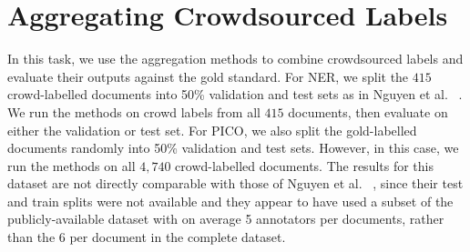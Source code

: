 \section{Aggregating Crowdsourced Labels}

In this task, we use the aggregation methods to combine crowdsourced labels and evaluate their outputs against the gold standard.
For NER, we split the $415$ crowd-labelled documents into 50\% validation and test sets as in Nguyen et al. ~. We run the methods on crowd labels from all $415$ documents, then evaluate on either the
validation or test set.
For PICO, we also split the gold-labelled documents randomly into 50\% validation and test sets. However, in this case, we run the methods on all $4,740$ crowd-labelled documents. The results for this dataset are not directly comparable
with those of Nguyen et al. ~, since their test and train splits were not available 
and they appear to have used a subset of the publicly-available dataset with on average 5 annotators per documents, rather than the 6 per document in the complete dataset.



